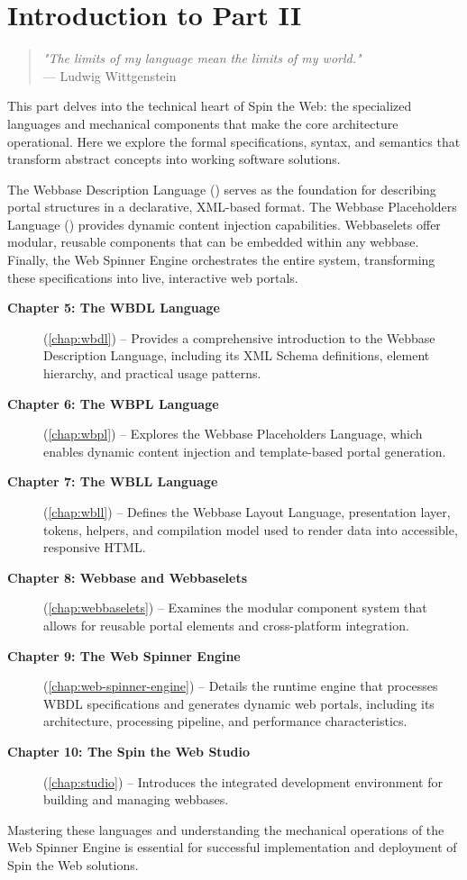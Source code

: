 
\chapter*{Introduction to Part II}
\label{part:languages}

\begin{quote}
\textit{"The limits of my language mean the limits of my world."} \\
— Ludwig Wittgenstein
\end{quote}

This part delves into the technical heart of Spin the Web: the specialized languages and mechanical components that make the core architecture operational. Here we explore the formal specifications, syntax, and semantics that transform abstract concepts into working software solutions.

The Webbase Description Language (\wbdl{}) serves as the foundation for describing portal structures in a declarative, XML-based format. The Webbase Placeholders Language (\wbpl{}) provides dynamic content injection capabilities. Webbaselets offer modular, reusable components that can be embedded within any webbase. Finally, the Web Spinner Engine orchestrates the entire system, transforming these specifications into live, interactive web portals.

\begin{description}
\item[\textbf{Chapter 5: The WBDL Language}] (\cref{chap:wbdl}) -- Provides a comprehensive introduction to the Webbase Description Language, including its XML Schema definitions, element hierarchy, and practical usage patterns.

\item[\textbf{Chapter 6: The WBPL Language}] (\cref{chap:wbpl}) -- Explores the Webbase Placeholders Language, which enables dynamic content injection and template-based portal generation.

\item[\textbf{Chapter 7: The WBLL Language}] (\cref{chap:wbll}) -- Defines the Webbase Layout Language, presentation layer, tokens, helpers, and compilation model used to render data into accessible, responsive HTML.

\item[\textbf{Chapter 8: Webbase and Webbaselets}] (\cref{chap:webbaselets}) -- Examines the modular component system that allows for reusable portal elements and cross-platform integration.

\item[\textbf{Chapter 9: The Web Spinner Engine}] (\cref{chap:web-spinner-engine}) -- Details the runtime engine that processes WBDL specifications and generates dynamic web portals, including its architecture, processing pipeline, and performance characteristics.

\item[\textbf{Chapter 10: The Spin the Web Studio}] (\cref{chap:studio}) -- Introduces the integrated development environment for building and managing webbases.

\end{description}

Mastering these languages and understanding the mechanical operations of the Web Spinner Engine is essential for successful implementation and deployment of Spin the Web solutions.
